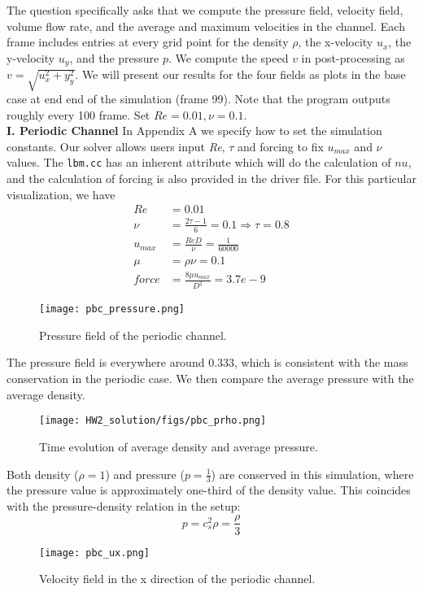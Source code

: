 The question specifically asks that we compute the pressure field, velocity field,
volume flow rate, and the average and maximum velocities in the channel.
Each frame includes entries at every grid point for the density $\rho$, the x-velocity $u_x$, the y-velocity $u_y$, and the pressure $p$. We compute the speed $v$ in post-processing as $v = \sqrt{u_x^2 + y_y^2}$. We will present our results for the four fields as plots in the base case at end end of the simulation (frame 99). Note that the program outputs roughly every 100 frame. Set $\textit{Re}=0.01, \nu=0.1$. \\

\textbf{I. Periodic Channel} In Appendix A we specify how to set the simulation constants. Our solver allows users input \textit{Re}, $\tau$ and forcing to fix $u_{max}$ and $\nu$ values. The \texttt{lbm.cc} has an inherent attribute which will do the calculation of $nu$, and the calculation of forcing is also provided in the driver file. For this particular visualization, we have
\begin{align}
    \textit{Re} &= 0.01 \\
    \nu &= \frac{2\tau - 1}{6} = 0.1 \Rightarrow \tau = 0.8 \\
    u_{max} &= \frac{\textit{Re}D}{\nu} = \frac{1}{60000} \\
    \mu &= \rho \nu = 0.1 \\
    force &= \frac{8\mu u_{max}}{D^2} = 3.7e-9
\end{align}
\begin{figure}[H]
    \centering
    \texttt{[image: pbc\_pressure.png]}
    \caption{Pressure field of the periodic channel.}
\end{figure}
The pressure field is everywhere around 0.333, which is consistent with the mass conservation in the periodic case. We then compare the average pressure with the average density. 
\begin{figure}[H]
    \centering
    \texttt{[image: HW2\_solution/figs/pbc\_prho.png]}
    \caption{Time evolution of average density and average pressure.}
\end{figure}
Both density ($\rho=1$) and pressure ($p=\frac{1}{3}$) are conserved in this simulation, where the pressure value is approximately one-third of the density value. This coincides with the pressure-density relation in the setup:
$$p = c_s^2\rho=\frac{\rho}{3}$$

\begin{figure}[H]
    \centering
    \texttt{[image: pbc\_ux.png]}
    \caption{Velocity field in the x direction of the periodic channel.}
\end{figure}

